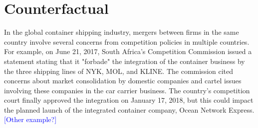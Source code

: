 \documentclass[10pt]{article}
\begin{document}
\section{Counterfactual}\label{sec:counterfactuals}

In the global container shipping industry, mergers between firms in the same country involve several concerns from competition policies in multiple countries.
For example, on June 21, 2017, South Africa's Competition Commission issued a statement stating that it "forbade" the integration of the container business by the three shipping lines of NYK, MOL, and KLINE. 
The commission cited concerns about market consolidation by domestic companies and cartel issues involving these companies in the car carrier business.
The country's competition court finally approved the integration on January 17, 2018, but this could impact the planned launch of the integrated container company, Ocean Network Express. 
\textcolor{blue}{[Other example?]}
\end{document}
